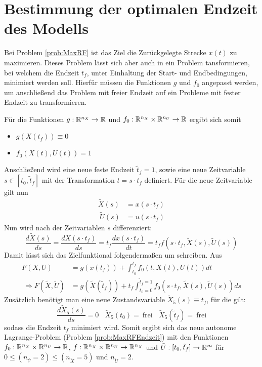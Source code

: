 \chapter{Bestimmung der optimalen Endzeit des Modells}\label{kap:OptTf}
Bei Problem \ref{prob:MaxRF} ist das Ziel die Zurückgelegte Strecke $x(t)$ zu maximieren. Dieses Problem lässt sich aber auch in ein Problem tansformieren, bei welchem die Endzeit $t_f$, unter Einhaltung der Start- und Endbedingungen, minimiert werden soll. Hierfür müssen die Funktionen $g$ und $f_0$ angepasst werden, um anschließend das Problem mit freier Endzeit auf ein Probleme mit fester Endzeit zu transformieren.

Für die Funktionen $g : \mathbb{R}^{n_X} \to \mathbb{R}$ und $f_0 : \mathbb{R}^{n_X} \times \mathbb{R}^{n_U} \to \mathbb{R}$ ergibt sich somit
\begin{itemize}
\item $g(X(t_f)) \equiv 0$
%
\item $f_0(X(t),U(t)) = 1$ 
\end{itemize}
Anschließend wird eine neue feste Endzeit $\tilde{t}_f = 1$, sowie eine neue Zeitvariable $s \in [t_0,\tilde{t}_f]$ mit der Transformation $t = s \cdot t_f$ definiert. Für die neue Zeitvariable gilt nun
\[\begin{split}
\tilde{X}(s) &= x(s \cdot t_f) \\\
\tilde{U}(s) &= u(s \cdot t_f)
\end{split}\] 
Nun wird nach der Zeitvariablen $s$ differenziert:
\[\dfrac{d \tilde{X}(s)}{ds} = \dfrac{d X(s \cdot t_f)}{ds} = t_f \dfrac{d x(s \cdot t_f)}{dt} = t_f f(s \cdot t_f,\tilde{X}(s),\tilde{U}(s)) \]
Damit lässt sich das Zielfunktional folgendermaßen um schreiben. Aus
\[\begin{split}
F(X,U) &= g(x(t_f)) + \int^{t_f}_{t_0} f_0(t,X(t),U(t)) dt \\\
\Rightarrow F(\tilde{X},\tilde{U}) &= g(\tilde{X}(\tilde{t}_f)) + t_f \int^{\tilde{t}_f = 1}_{t_0 = 0} f_0(s \cdot t_f,\tilde{X}(s),\tilde{U}(s)) ds 
\end{split}\]
Zusätzlich benötigt man eine neue Zustandsvariable $\tilde{X}_5(s) \equiv t_f$, für die gilt: \[\dfrac{d \tilde{X}_5(s)}{ds} = 0 \ \ \ \ \tilde{X}_5(t_0) =\ \text{frei} \ \ \ \ \tilde{X}_5(\tilde{t}_f) =\ \text{frei}\] sodass die Endzeit $t_f$ minimiert wird. Somit ergibt sich das neue autonome Lagrange-Problem (Problem \ref{prob:MaxRFEndzeit}) mit den Funktionen $f_0 : \mathbb{R}^{n_{\tilde{X}}} \times \mathbb{R}^{n_{\tilde{U}}} \to \mathbb{R}$, $f : \mathbb{R}^{n_{\tilde{X}}} \times \mathbb{R}^{n_{\tilde{U}}} \to \mathbb{R}^{n_{\tilde{X}}}$ und $\tilde{U} : [t_0,\tilde{t}_f] \to \mathbb{R}^m$ für $0 \leq (n_{\psi} = 2) \leq (n_{\tilde{X}} = 5)$ und $n_{\tilde{U}} = 2$.

